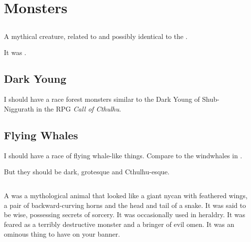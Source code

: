\chapter{Monsters}















\section{\Chimaera}
\index{\Chimaera}
A mythical creature, related to and possibly identical to the . 

It was . 















\section{Dark Young}
I should have a race forest monsters similar to the Dark Young of Shub-Niggurath in the RPG \emph{Call of Cthulhu}. 














\section{Flying Whales}
I should have a race of flying whale-like things. 
Compare to the windwhales in \cite{GlenCook:TheWhiteRose}. 

But they should be dark, grotesque and Cthulhu-esque. 














\section{\Malgryph}
\index{\malgryph}
A \malgryph was a mythological animal that looked like a giant nycan with feathered wings, a pair of backward-curving horns and the head and tail of a snake.
It was said to be wise, possessing secrets of sorcery.
It was occasionally used in heraldry. 
It was feared as a terribly destructive monster and a bringer of evil omen.
It was an ominous thing to have on your banner.

